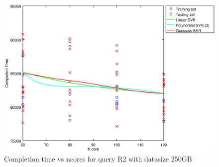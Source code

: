 
\begin {figure}[hbtp]
\centering
\includegraphics[width=\textwidth]{output/R2_250_ONLY_1_OVER_NCORES/plot_R2_250_bestmodels.eps}
\caption{Completion time vs ncores for query R2 with datasize 250GB}
\label{fig:all_nonlinear_R2_250}
\end {figure}
